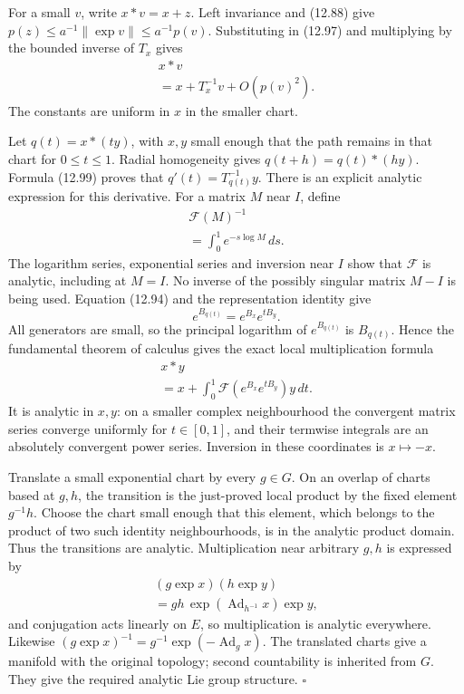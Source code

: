\documentclass[
  11pt,
]{article}
\begin{document}
For a small \(v\), write \(x*v=x+z\). Left invariance and (12.88) give
\(p(z)\leq a^{-1}\|\exp v\|\leq a^{-1}p(v)\). Substituting in (12.97)
and multiplying by the bounded inverse of \(T_x\) gives \[
\begin{gathered}
x*v\\
=x+T_x^{-1}v+O(p(v)^2).
\end{gathered}
\tag{12.99}
\] The constants are uniform in \(x\) in the smaller chart.

Let \(q(t)=x*(ty)\), with \(x,y\) small enough that the path remains in
that chart for \(0\leq t\leq1\). Radial homogeneity gives
\(q(t+h)=q(t)*(hy)\). Formula (12.99) proves that
\(q'(t)=T_{q(t)}^{-1}y\). There is an explicit analytic expression for
this derivative. For a matrix \(M\) near \(I\), define \[
\begin{gathered}
\mathcal F(M)^{-1}\\
=\int_0^1 e^{-s\log M}\,ds.
\end{gathered}
\tag{12.100}
\] The logarithm series, exponential series and inversion near \(I\)
show that \(\mathcal F\) is analytic, including at \(M=I\). No inverse
of the possibly singular matrix \(M-I\) is being used. Equation (12.94)
and the representation identity give \[
e^{B_{q(t)}}=e^{B_x}e^{tB_y}.
\tag{12.101}
\] All generators are small, so the principal logarithm of
\(e^{B_{q(t)}}\) is \(B_{q(t)}\). Hence the fundamental theorem of
calculus gives the exact local multiplication formula \[
\begin{gathered}
x*y\\
=x+\int_0^1
       \mathcal F(e^{B_x}e^{tB_y})y\,dt.
\end{gathered}
\tag{12.102}
\] It is analytic in \(x,y\): on a smaller complex neighbourhood the
convergent matrix series converge uniformly for \(t\in[0,1]\), and their
termwise integrals are an absolutely convergent power series. Inversion
in these coordinates is \(x\mapsto-x\).

Translate a small exponential chart by every \(g\in G\). On an overlap
of charts based at \(g,h\), the transition is the just-proved local
product by the fixed element \(g^{-1}h\). Choose the chart small enough
that this element, which belongs to the product of two such identity
neighbourhoods, is in the analytic product domain. Thus the transitions
are analytic. Multiplication near arbitrary \(g,h\) is expressed by \[
\begin{gathered}
(g\exp x)(h\exp y)\\
=gh\,\exp(\operatorname{Ad}_{h^{-1}}x)\exp y,
\end{gathered}
\tag{12.103}
\] and conjugation acts linearly on \(E\), so multiplication is analytic
everywhere. Likewise
\((g\exp x)^{-1}=g^{-1}\exp(-\operatorname{Ad}_g x)\). The translated
charts give a manifold with the original topology; second countability
is inherited from \(G\). They give the required analytic Lie group
structure. \(\square\)
\end{document}
